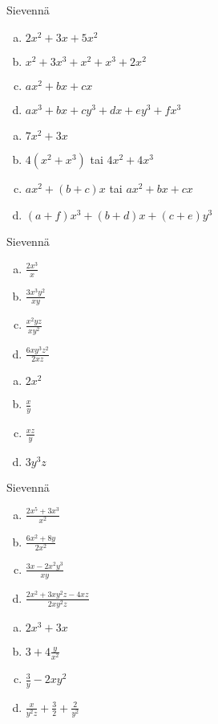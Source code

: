 \begin{tehtava}
Sievennä
	\begin{enumerate}[a)]
	\item $2x^2+3x+5x^2$
	\item $x^2+3x^3+x^2+x^3+2x^2$
	\item $ax^2+bx+cx$
	\item $ax^3+bx+cy^3+dx+ey^3+fx^3$
	\end{enumerate}

\begin{vastaus}
	\begin{enumerate}[a)]
	\item $7x^2+3x$
	\item $4(x^2+x^3)$ tai $4x^2+4x^3$
	\item $ax^2+(b+c)x$ tai $ax^2+bx+cx$
	\item $(a+f)x^3+(b+d)x+(c+e)y^3$
	\end{enumerate}
\end{vastaus}
\end{tehtava}

\begin{tehtava}
Sievennä
	\begin{enumerate}[a)]
	\item $\frac{2x^3}{x}$
	\item $\frac{3x^3y^2}{xy}$
	\item $\frac{x^2yz}{xy^2}$
	\item $\frac{6xy^3z^2}{2xz}$
	\end{enumerate}

\begin{vastaus}
	\begin{enumerate}[a)]
	\item $2x^2$
	\item $\frac{x}{y}$
	\item $\frac{xz}{y}$
	\item $3y^3z$
	\end{enumerate}
\end{vastaus}
\end{tehtava}

\begin{tehtava}
Sievennä
	\begin{enumerate}[a)]
	\item $\frac{2x^5+3x^3}{x^2}$
	\item $\frac{6x^2+8y}{2x^2}$
	\item $\frac{3x-2x^2y^3}{xy}$
	\item $\frac{2x^2+3xy^2z-4xz}{2xy^2z}$
	\end{enumerate}

\begin{vastaus}
	\begin{enumerate}[a)]
	\item $2x^3+3x$
	\item $3+4 \frac{y}{x^2}$
	\item $\frac{3}{y} - 2xy^2$
	\item $\frac{x}{y^2z} + \frac{3}{2} + \frac{2}{y^2}$
	\end{enumerate}
\end{vastaus}
\end{tehtava}

